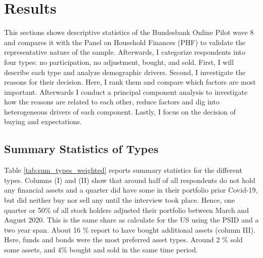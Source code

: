 \documentclass[ProjectABM]{subfiles}
\begin{document}



\section{Results}\label{sec:results}
This sections shows descriptive statistics of the Bundesbank Online Pilot wave 8 and compares it with the Panel on Household Finances (PHF) to validate the representative nature of the sample. Afterwards, I categorize respondents into four types: no participation, no adjustment, bought, and sold. First, I will describe each type and analyze demographic drivers. Second, I investigate the reasons for their decision. Here, I rank them and compare which factors are most important. Afterwards I conduct a principal component analysis to investigate how the reasons are related to each other, reduce factors and dig into heterogeneous drivers of each component. Lastly, I focus on the decision of buying and expectations. 

\subsection{Summary Statistics of Types}\label{sec:des_types}

Table \ref{tab:sum_types_weighted} reports summary statistics for the different types. Columns (I) and (II) show that around half of all respondents do not hold any financial assets and a quarter did have some in their portfolio prior Covid-19, but did neither buy nor sell any until the interview took place. Hence, one quarter or 50\% of all stock holders adjusted their portfolio between March and August 2020. This is the same share as \cite{bonaparte_et_al_2012adjustment} calculate for the US using the PSID and a two year span. %
About 16 \% report to have bought additional assets (column III). Here, funds and bonds were the most preferred asset types. Around 2 \% sold some assets, and 4\% bought and sold in the same time period. 
\end{document}
